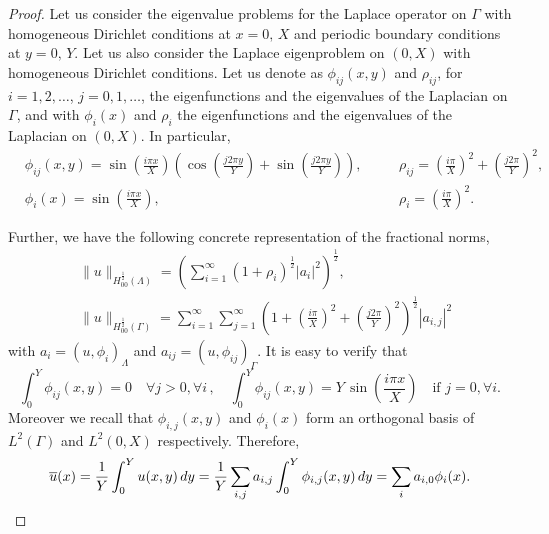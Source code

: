 \begin{proof}
Let us consider the eigenvalue problems for the Laplace operator on $\Gamma$ with homogeneous Dirichlet conditions at $x=0,\, X$ and periodic boundary conditions at $y=0,\, Y$. Let us also consider the Laplace eigenproblem on $(0,X)$ with homogeneous Dirichlet conditions. Let us denote as $\phi _{ij}(x,y)$ and $\rho _{ij}$, for $i=1,2,\dots$, $j=0,1,\dots$, the eigenfunctions and the eigenvalues of the Laplacian on $\Gamma$, and with $\phi _i(x)$ and $\rho _i$ the eigenfunctions and the eigenvalues of the Laplacian on $(0,X)$. In particular,
\begin{align*}
&\phi _{ij}(x,y)=\sin \left(\frac{i\pi x}{X}\right)\left( \cos\left(\frac{j2\pi y}{Y}\right)+ \sin\left(\frac{j2\pi y}{Y}\right) \right),\quad
&&\rho_{ij}=\left(\frac{i\pi}{X}\right) ^2+\left(\frac{j2\pi}{Y}\right)^2,
\\
&\phi _{i}(x)=\sin \left(\frac{i\pi x}{X}\right),\quad
&&\rho _i = \left(\frac{i\pi}{X}\right) ^2.
\end{align*}

Further, we have
the following concrete representation of the fractional norms, 
\begin{equation}\label{eq:fracnorm_lambda}
\begin{aligned}
&\|u\|_{H^{\frac 12}_{00}(\Lambda)}=\left(\sum_{i=1}^{\infty} \left( 1+ \rho_{i}\right)^{\frac 12}|a_i|^2\right)^{\frac 12},\\
&\|u\|_{H^{\frac 12}_{00}(\Gamma)}=
\sum_{i=1}^{\infty} \sum_{j=1}^{\infty}  \left( 1+ \left(\frac{i\pi}{X}\right)^2 
+ \left(\frac{j2\pi}{Y}\right)^2\right)^{\frac 12} |a_{i,j}|^2
\end{aligned}
\end{equation} 
with $a_i=\left(u, \phi _i \right)_{\Lambda}$ and $a_{ij}=\left( u, \phi_{ij}\right)_{\Gamma}$.
It is easy to verify that 
\begin{equation}\label{int_eigenf}
\int_0^{Y} \phi _{ij}(x,y)=0 \quad \forall j>0, \forall i\,,
\quad
\int_0^{Y} \phi _{ij}(x,y)= Y \, \sin\left(\frac{i\pi x}{X}\right) \quad \mbox{if } j=0, \forall i  .
\end{equation}
Moreover we recall that $\phi_{i,j}(x,y)$ and $\phi _i(x)$ form an orthogonal basis of $L^2(\Gamma)$ and $L^2(0,X)$ respectively. Therefore,
\begin{equation*}
\overline{u}(x)=\frac{1}{Y}\int_0^{Y} u(x,y)\, dy
= \frac{1}{Y}\sum_{i,j} a_{i,j}\int_0^{Y}  \phi_{i,j}(x,y) \, dy
=  \sum_{i} a_{i,0} \phi_{i}(x).
\end{equation*}


\end{proof}
